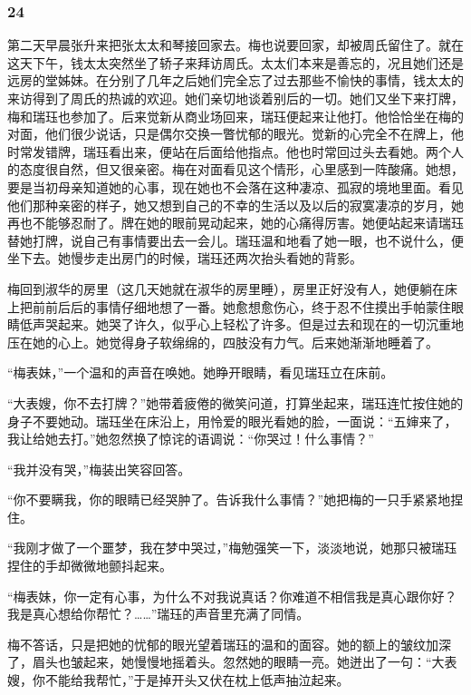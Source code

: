 \subsubsection*{24}

\par 第二天早晨张升来把张太太和琴接回家去。梅也说要回家，却被周氏留住了。就在这天下午，钱太太突然坐了轿子来拜访周氏。太太们本来是善忘的，况且她们还是远房的堂姊妹。在分别了几年之后她们完全忘了过去那些不愉快的事情，钱太太的来访得到了周氏的热诚的欢迎。她们亲切地谈着别后的一切。她们又坐下来打牌，梅和瑞珏也参加了。后来觉新从商业场回来，瑞珏便起来让他打。他恰恰坐在梅的对面，他们很少说话，只是偶尔交换一瞥忧郁的眼光。觉新的心完全不在牌上，他时常发错牌，瑞珏看出来，便站在后面给他指点。他也时常回过头去看她。两个人的态度很自然，但又很亲密。梅在对面看见这个情形，心里感到一阵酸痛。她想，要是当初母亲知道她的心事，现在她也不会落在这种凄凉、孤寂的境地里面。看见他们那种亲密的样子，她又想到自己的不幸的生活以及以后的寂寞凄凉的岁月，她再也不能够忍耐了。牌在她的眼前晃动起来，她的心痛得厉害。她便站起来请瑞珏替她打牌，说自己有事情要出去一会儿。瑞珏温和地看了她一眼，也不说什么，便坐下去。她慢步走出房门的时候，瑞珏还两次抬头看她的背影。
\par 梅回到淑华的房里（这几天她就在淑华的房里睡），房里正好没有人，她便躺在床上把前前后后的事情仔细地想了一番。她愈想愈伤心，终于忍不住摸出手帕蒙住眼睛低声哭起来。她哭了许久，似乎心上轻松了许多。但是过去和现在的一切沉重地压在她的心上。她觉得身子软绵绵的，四肢没有力气。后来她渐渐地睡着了。
\par “梅表妹，”一个温和的声音在唤她。她睁开眼睛，看见瑞珏立在床前。
\par “大表嫂，你不去打牌？”她带着疲倦的微笑问道，打算坐起来，瑞珏连忙按住她的身子不要她动。瑞珏坐在床沿上，用怜爱的眼光看她的脸，一面说：“五婶来了，我让给她去打。”她忽然换了惊诧的语调说：“你哭过！什么事情？”
\par “我并没有哭，”梅装出笑容回答。
\par “你不要瞒我，你的眼睛已经哭肿了。告诉我什么事情？”她把梅的一只手紧紧地捏住。
\par “我刚才做了一个噩梦，我在梦中哭过，”梅勉强笑一下，淡淡地说，她那只被瑞珏捏住的手却微微地颤抖起来。
\par “梅表妹，你一定有心事，为什么不对我说真话？你难道不相信我是真心跟你好？我是真心想给你帮忙？……”瑞珏的声音里充满了同情。
\par 梅不答话，只是把她的忧郁的眼光望着瑞珏的温和的面容。她的额上的皱纹加深了，眉头也皱起来，她慢慢地摇着头。忽然她的眼睛一亮。她迸出了一句：“大表嫂，你不能给我帮忙，”于是掉开头又伏在枕上低声抽泣起来。
